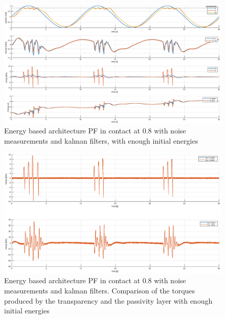 \documentclass[a4paper,12pt]{article}
\begin{document}
\begin{figure}[H]
    \begin{center}
        \hspace*{-4.5cm}
        \includegraphics[scale=0.5]{images/energy_pf_kalman.eps}
    \end{center}
    \caption{Energy based architecture PF in contact at 0.8 with noise measurements and kalman filters, with enough initial energies}
    \label{fig:energy_pf_kalman}
\end{figure}

\begin{figure}[H]
    \begin{center}
        \hspace*{-4.5cm}
        \includegraphics[scale=0.5]{images/energy_pf_tau_kalman.eps}
    \end{center}
    \caption{Energy based architecture PF in contact at 0.8 with noise measurements and kalman filters. Comparison of the torques produced by the transparency and the passivity layer with enough initial energies}
    \label{fig:energy_pf_tau_kalman}
\end{figure}
\end{document}
